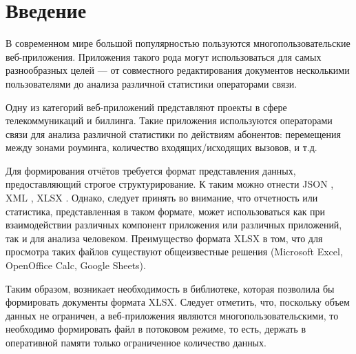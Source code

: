 \documentclass[14pt]{matmex-diploma}
\begin{document}
\maketitle
\tableofcontents
\section*{Введение}
В современном мире большой популярностью пользуются многопользовательские веб-приложения. Приложения такого рода могут использоваться для самых разнообразных целей --- от совместного редактирования документов несколькими пользователями до анализа различной статистики операторами связи.

Одну из категорий веб-приложений представляют проекты в сфере телекоммуникаций и биллинга. Такие приложения используются операторами связи для анализа различной статистики по действиям абонентов: перемещения между зонами роуминга, количество входящих/исходящих вызовов, и т.д.

Для формирования отчётов требуется формат представления данных, предоставляющий строгое структурирование. К таким можно отнести JSON \cite{json}, XML \cite{xml}, XLSX \cite{xlsx}. Однако, следует принять во внимание, что отчетность или статистика, представленная в таком формате, может использоваться как при взаимодействии различных компонент приложения или различных приложений, так и для анализа человеком. Преимущество формата XLSX в том, что для просмотра таких файлов существуют общеизвестные решения (Microsoft Excel, OpenOffice Calc, Google Sheets). 

Таким образом, возникает необходимость в библиотеке, которая позволила бы формировать документы формата XLSX. Следует отметить, что, поскольку объем данных не ограничен, а веб-приложения являются многопользовательскими, то необходимо формировать файл в потоковом режиме, то есть, держать в оперативной памяти только ограниченное количество данных. 
\end{document}

